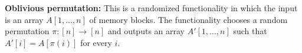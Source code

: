 \smallskip
\noindent
 {\bf Oblivious permutation:} 
This is a randomized functionality in which the input is an array $A[1,\ldots,n]$ of memory blocks. The functionality chooses a random permutation $\pi:[n] \rightarrow [n]$ and outputs an array $A'[1,\ldots,n]$ such that $A'[i] = A[\pi(i)]$ for every $i$. %


%
%
%
%
